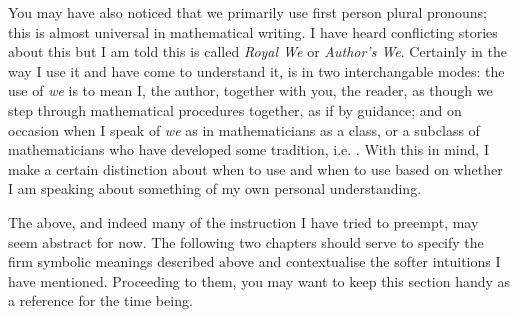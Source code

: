 \documentclass[11pt]{article}
\begin{document}
You may have also noticed that we primarily use first person plural pronouns; this is almost universal in mathematical writing. I have heard conflicting stories about this but I am told this is called \emph{Royal We} or \emph{Author's We}. Certainly in the way I use it and have come to understand it, is in two interchangable modes: the use of \emph{we} is to mean I, the author, together with you, the reader, as though we step through mathematical procedures together, as if by guidance; and on occasion when I speak of \emph{we} as in mathematicians as a class, or a subclass of mathematicians who have developed some tradition, i.e. . With this in mind, I make a certain distinction about when to use  and when to use  based on whether I am speaking about something of my own personal understanding.

The above, and indeed many of the instruction I have tried to preempt, may seem abstract for now. The following two chapters should serve to specify the firm symbolic meanings described above and contextualise the softer intuitions I have mentioned. Proceeding to them, you may want to keep this section handy as a reference for the time being.
\end{document}
